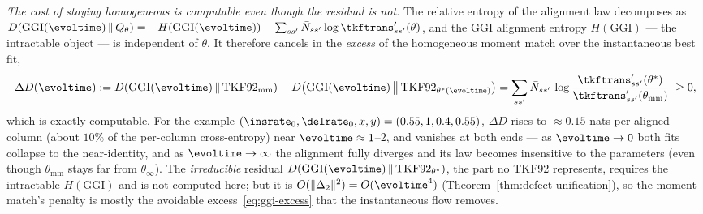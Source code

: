 \emph{The cost of staying homogeneous is computable even though the residual is
not.}  The relative entropy of the alignment law decomposes as
$\dkl{\mathrm{GGI}(\evoltime)}{Q_\theta}=-H(\mathrm{GGI}(\evoltime))-\sum_{ss'}\bar
N_{ss'}\log\tkftrans'_{ss'}(\theta)$, and the GGI alignment entropy
$H(\mathrm{GGI})$ --- the intractable object --- is independent of $\theta$.  It
therefore cancels in the \emph{excess} of the homogeneous moment match over the
instantaneous best fit,
\begin{equation}
\label{eq:ggi-excess}
\Delta D(\evoltime)
  := \dkl{\mathrm{GGI}(\evoltime)}{\mathrm{TKF92}_{\mathrm{mm}}}
   - \dkl{\mathrm{GGI}(\evoltime)}{\mathrm{TKF92}_{\theta^\ast(\evoltime)}}
   = \sum_{ss'}\bar N_{ss'}\,
     \log\frac{\tkftrans'_{ss'}(\theta^\ast)}{\tkftrans'_{ss'}(\theta_{\mathrm{mm}})}
     \;\ge 0,
\end{equation}
which is exactly computable.  For the example $(\insrate_0,\delrate_0,x,y)=(0.55,1,0.4,0.55)$,
$\Delta D$ rises to $\approx0.15$ nats per aligned column (about $10\%$ of the
per-column cross-entropy) near $\evoltime\approx1$--$2$, and vanishes at both
ends --- as $\evoltime\to0$ both fits collapse to the near-identity, and as
$\evoltime\to\infty$ the alignment fully diverges and its law becomes
insensitive to the parameters (even though $\theta_{\mathrm{mm}}$ stays far from
$\theta_\infty$).  The \emph{irreducible} residual
$\dkl{\mathrm{GGI}(\evoltime)}{\mathrm{TKF92}_{\theta^\ast}}$, the part no TKF92
represents, requires the intractable $H(\mathrm{GGI})$ and is not computed here;
but it is $O(\|\compdefect\|^2)=O(\evoltime^4)$
(Theorem~\ref{thm:defect-unification}), so the moment match's penalty is mostly
the avoidable excess~\eqref{eq:ggi-excess} that the instantaneous flow removes.
